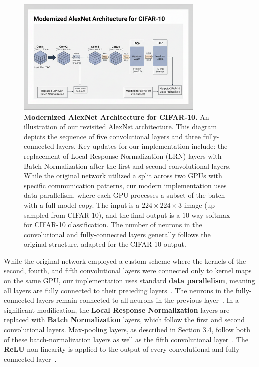 \documentclass{article}
\begin{document}
\begin{figure}[h!]
    \centering
    \includegraphics[width=0.8\textwidth]{images/figure2_image_filename.png} 
    \caption{
        \textbf{Modernized AlexNet Architecture for CIFAR-10.} An illustration of our revisited AlexNet architecture. This diagram depicts the sequence of five convolutional layers and three fully-connected layers. Key updates for our implementation include: the replacement of Local Response Normalization (LRN) layers with Batch Normalization after the first and second convolutional layers. While the original network utilized a split across two GPUs with specific communication patterns, our modern implementation uses data parallelism, where each GPU processes a subset of the batch with a full model copy. The input is a $224\times 224\times 3$ image (up-sampled from CIFAR-10), and the final output is a $10$-way softmax for CIFAR-10 classification. The number of neurons in the convolutional and fully-connected layers generally follows the original structure, adapted for the CIFAR-10 output.
    }
    \label{fig:modern_alexnet_cifar10}
\end{figure}

While the original network employed a custom scheme where the kernels of the second, fourth, and fifth convolutional layers were connected only to kernel maps on the same GPU, our implementation uses standard \textbf{data parallelism}, meaning all layers are fully connected to their preceding layers~\cite{krizhevsky2012imagenet}. The neurons in the fully-connected layers remain connected to all neurons in the previous layer~\cite{krizhevsky2012imagenet}. In a significant modification, the \textbf{Local Response Normalization} layers are replaced with \textbf{Batch Normalization} layers, which follow the first and second convolutional layers. Max-pooling layers, as described in Section 3.4, follow both of these batch-normalization layers as well as the fifth convolutional layer~\cite{krizhevsky2012imagenet}. The \textbf{ReLU} non-linearity is applied to the output of every convolutional and fully-connected layer~\cite{krizhevsky2012imagenet}.
\end{document}

